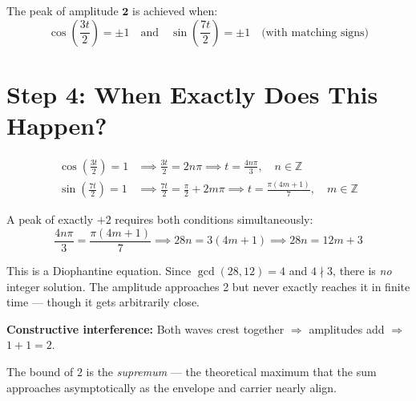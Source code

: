 \documentclass[12pt]{article}
\begin{document}
The peak of amplitude $\mathbf{2}$ is achieved when:
\[
\cos\!\left(\frac{3t}{2}\right) = \pm 1 \quad\text{and}\quad \sin\!\left(\frac{7t}{2}\right) = \pm 1 \quad\text{(with matching signs)}
\]

\section*{Step 4: When Exactly Does This Happen?}

\begin{align*}
\cos\!\left(\frac{3t}{2}\right) = 1 &\implies \frac{3t}{2} = 2n\pi \implies t = \frac{4n\pi}{3}, \quad n \in \mathbb{Z} \\[6pt]
\sin\!\left(\frac{7t}{2}\right) = 1 &\implies \frac{7t}{2} = \frac{\pi}{2} + 2m\pi \implies t = \frac{\pi(4m+1)}{7}, \quad m \in \mathbb{Z}
\end{align*}

A peak of exactly $+2$ requires both conditions simultaneously:
\[
\frac{4n\pi}{3} = \frac{\pi(4m+1)}{7} \implies 28n = 3(4m+1) \implies 28n = 12m + 3
\]

This is a Diophantine equation. Since $\gcd(28, 12) = 4$ and $4 \nmid 3$, there is \emph{no} integer solution. The amplitude approaches 2 but never exactly reaches it in finite time --- though it gets arbitrarily close.

\begin{tcolorbox}[colback=green!5, colframe=green!50!black, title=Physical Intuition]
\textbf{Constructive interference:} Both waves crest together $\Rightarrow$ amplitudes add $\Rightarrow$ $1 + 1 = 2$.

\medskip

The bound of $2$ is the \emph{supremum} --- the theoretical maximum that the sum approaches asymptotically as the envelope and carrier nearly align.
\end{tcolorbox}
\end{document}
